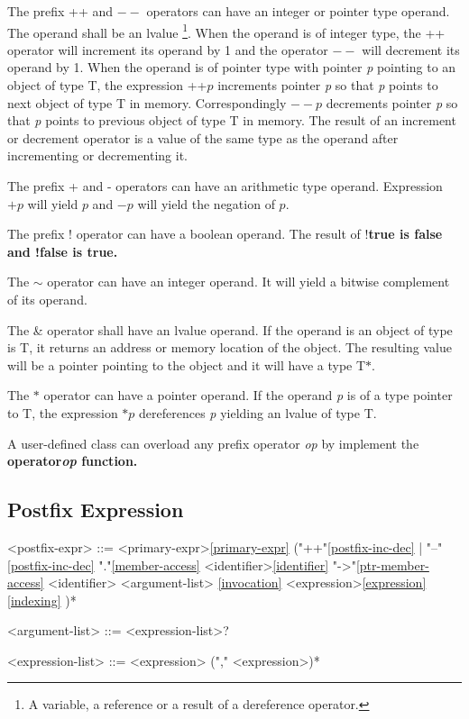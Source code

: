 \documentclass[a4paper,oneside,11pt]{article}
\begin{document}
The prefix ++ and $--$ operators can have an integer or pointer type operand.
The operand shall be an lvalue \footnote{A variable, a reference or a result of a dereference operator.}.
When the operand is of integer type, the ++ operator will increment its operand by 1 and the operator $--$ will decrement its operand by 1.
When the operand is of pointer type with pointer \emph{p} pointing to an object of type T,
the expression ++$p$ increments pointer \emph{p} so that \emph{p} points to next object of type T in memory.
Correspondingly $--p$ decrements pointer \emph{p} so that \emph{p} points to previous object of type T in memory.
The result of an increment or decrement operator is a value of the same type as the operand after incrementing or decrementing it.

The prefix + and - operators can have an arithmetic type operand.
Expression $+p$ will yield $p$ and $-p$ will yield the negation of $p$.

The prefix ! operator can have a boolean operand. The result of !\bf{true} is \bf{false} and !\bf{false} is \bf{true}.

The $\sim$ operator can have an integer operand. It will yield a bitwise complement of its operand.

The \& operator shall have an lvalue operand.
If the operand is an object of type is T, it returns an address or memory location of the object.
The resulting value will be a pointer pointing to the object and it will have a type T$*$.

The $*$ operator can have a pointer operand. If the operand \emph{p} is of a type pointer to T,
the expression $*p$ dereferences \emph{p} yielding an lvalue of type T.

A user-defined class can overload any prefix operator \emph{op} by implement the \bf{operator\emph{op}} function.

\subsection{Postfix Expression}

\begin{grammar}
\label{postfix-expr}<postfix-expr> ::= <primary-expr>\ref{primary-expr}
("++"\ref{postfix-inc-dec} | "--"\ref{postfix-inc-dec}
\alt "."\ref{member-access} <identifier>\ref{identifier}
\alt "->"\ref{ptr-member-access} <identifier>
\alt \lit{(} <argument-list> \lit{)}\ref{invocation}
\alt \lit{[} <expression>\ref{expression} \lit{]}\ref{indexing}
)*

\label{argument-list}<argument-list> ::= <expression-list>?

\label{expression-list}<expression-list> ::= <expression> ("," <expression>)*

\end{grammar}
\end{document}
